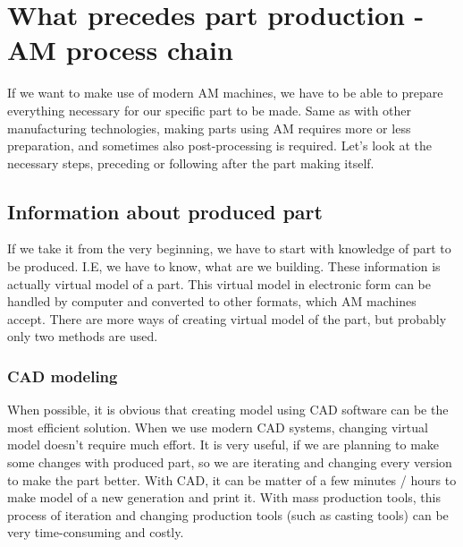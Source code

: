 \documentclass[a4paper]{report}
\begin{document}
\section{What precedes part production - AM process chain}
If we want to make use of modern AM machines, we have to be able to prepare everything necessary for our specific part to be made. Same as with other manufacturing  technologies, making parts using AM requires more or less preparation, and sometimes also post-processing is required. Let's look at the necessary steps, preceding or following after the part making itself.\\
\subsection{Information about produced part}
If we take it from the very beginning, we have to start with knowledge of part to be produced. I.E, we have to know, what are we building. These information is actually virtual model of a part. This virtual model in electronic form can be handled by computer and converted to other formats, which AM machines accept. There are more ways of creating virtual model of the part, but probably only two methods are used.
\subsubsection{CAD modeling}
When possible, it is obvious that creating model using CAD software can be the most efficient solution. When we use modern CAD systems, changing virtual model doesn't require much effort. It is very useful, if we are planning to make some changes with produced part, so we are iterating and changing every version to make the part better. With CAD, it can be matter of a few minutes / hours to make model of a new generation and print it. With mass production tools, this process of iteration and changing production tools (such as casting tools) can be very time-consuming and costly.
\end{document}
